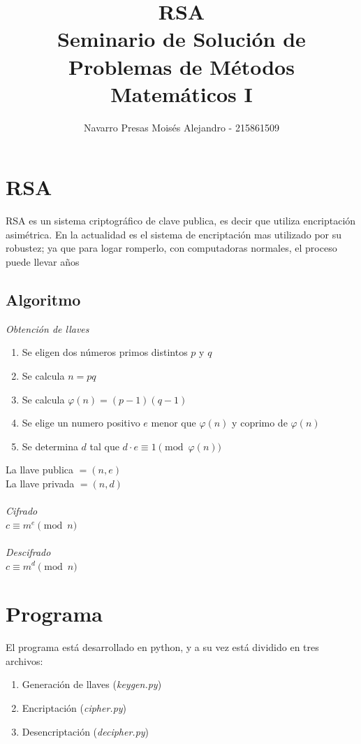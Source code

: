 \documentclass{article}
\author{Navarro Presas Moisés Alejandro - 215861509}
\title{
RSA\\
Seminario de Solución de Problemas de Métodos Matemáticos I
}
\begin{document}
  \maketitle
  \tableofcontents
  \newpage

  \section{RSA}
  RSA es un sistema criptográfico de clave publica, es decir que utiliza encriptación asimétrica. En la actualidad es el sistema de encriptación mas utilizado por su robustez; ya que para logar romperlo, con computadoras normales, el proceso puede llevar años

  \subsection{Algoritmo}
  \emph{Obtención de llaves}\\
  \begin{enumerate}
    \item Se eligen dos números primos distintos $p$ y $q$
    \item Se calcula $n = pq$
    \item Se calcula $\varphi(n) = (p-1)(q - 1)$
    \item Se elige un numero positivo $e$ menor que $\varphi(n)$ y coprimo de $\varphi(n)$
    \item Se determina $d$ tal que  $d \cdot e \equiv 1 \pmod{\varphi(n)}$
  \end{enumerate}
  La llave publica $=(n, e)$\\
  La llave privada $=(n, d)$\\
  \\
  \emph{Cifrado}\\
  $c \equiv m^e \pmod{n}$\\
  \\
  \emph{Descifrado}\\
  $c \equiv m^d \pmod{n}$\\

  \section{Programa}
  El programa está desarrollado en python, y a su vez está dividido en tres archivos:
  \begin{enumerate}
    \item Generación de llaves (\emph{keygen.py})
    \item Encriptación (\emph{cipher.py})
    \item Desencriptación (\emph{decipher.py})
  \end{enumerate}
\end{document}
